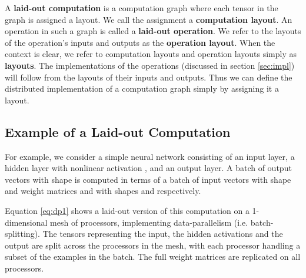 \documentclass{article}
\def \O {\varnothing}
\begin{document}
\begin{itemize}
\def \ZN {{\langle 0, \O \rangle}}
\def \NN {{\langle \O, \O \rangle}}


\def \Xshape {{{[\B, \DX]}}}
\def \Hshape {{{[\B, \DH]}}}
\def \Yshape {{{[\B, \DY]}}}
\def \Woneshape {{{[\DX, \DH]}}}
\def \Hshape {{{[\B, \DH]}}}
\def \Wtwoshape {{{[\DH, \DY]}}}
\def \XTshape {{{[\DX, b]}}}
\def \HTshape {{{[\DH, b]}}}
\def \YTshape {{{[\DY, b]}}}
\def \WoneTshape {{[\DH, \DX]}}
\def \WtwoTshape {{[\DY, \DH]}}
\def \OO {{{\{1\rightarrow1\}}}}
\def \OZ {{{\{1\rightarrow0\}}}}
\def \ZO{{{\{0\rightarrow1\}}}}
\def \ZNOO {{{\{0\rightarrow0,1\rightarrow1\}}}}
\def \BZ {{{\{b \rightarrow 0\}}}}
\def \HZ {{{\{d_h \rightarrow 0\}}}}
\def \BZHO {\{b \rightarrow 0, d_h \rightarrow 1\}}

\def \THREED {\{ \scalebox{0.8}{} \}}

A \textbf{laid-out computation} is a computation graph where each tensor in the graph is assigned a layout.  We call the assignment a \textbf{computation layout}.  An operation in such a graph is called a \textbf{laid-out operation}.  We refer to the layouts of the operation's inputs and outputs as the \textbf{operation layout}.  When the context is clear, we refer to computation layouts and operation layouts simply as \textbf{layouts}.  The implementations of the operations (discussed in section \ref{sec:impl}) will follow from the layouts of their inputs and outputs.  Thus we can define the distributed implementation of a computation graph simply by assigning it a layout.




\subsection{Example of a Laid-out Computation}

For example, we consider a simple neural network consisting of an input layer, a hidden layer with nonlinear activation , and an output layer.  A batch of output vectors  with shape   is computed in terms of a batch of input vectors  with shape  and weight matrices  and  with shapes  and  respectively.






Equation \ref{eq:dp1} shows a laid-out version of this computation on a 1-dimensional mesh of processors, implementing data-parallelism (i.e. batch-splitting).  The tensors representing the input, the hidden activations and the output are split across the processors in the mesh, with each processor handling a subset of the examples in the batch. The full weight matrices are replicated on all processors.



\end{itemize}
\end{document}
